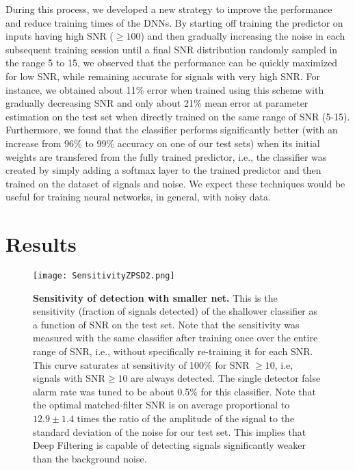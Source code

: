 \documentclass[aps,prd,%
amsmath,floats,floatfix, twocolumn, superscriptaddress,nofootinbib,showpacs]{revtex4-1}
\begin{document}
\noindent During this process, we developed a new strategy to improve the performance and reduce training times of the DNNs. By starting off training the predictor on inputs having high SNR ($\ge 100$) and then gradually increasing the noise in each subsequent training session until a final SNR distribution randomly sampled in the range 5 to 15, we observed that the performance can be quickly maximized for low SNR, while remaining accurate for signals with very high SNR. For instance, we obtained about 11\% error when trained using this scheme with gradually decreasing SNR and only about 21\% mean error at parameter estimation on the test set when directly trained on the same range of SNR (5-15).  Furthermore, we found that the classifier performs significantly better (with an increase from 96\% to 99\% accuracy on one of our test sets) when its initial weights are transfered from the fully trained predictor, i.e., the classifier was created by simply adding a softmax layer to the trained predictor and then trained on the dataset of signals and noise. We expect these techniques would be useful for training neural networks, in general, with noisy data. %


\section{Results} 
\label{result}

\begin{figure}
	
	\hspace{-.25in}	\texttt{[image: SensitivityZPSD2.png]}
	
	\caption{\textbf{Sensitivity of detection with smaller net.} This is the sensitivity (fraction of signals detected) of the shallower classifier as a function of SNR on the test set. Note that the sensitivity was measured with the same classifier after training once over the entire range of SNR, i.e., without specifically re-training it for each SNR. This curve saturates at sensitivity of 100\% for SNR $\ge 10$, i.e, signals with \(\textrm{SNR} \geq 10\) are always detected. The single detector false alarm rate was tuned to be about 0.5\% for this classifier. Note that the optimal matched-filter SNR is on average proportional to $12.9\pm1.4$ times the ratio of the amplitude of the signal to the standard deviation of the noise for our test set. This implies that Deep Filtering is capable of detecting signals significantly weaker than the background noise.}
	\label{fig:Sensitivity}
\end{figure}
\end{document}
